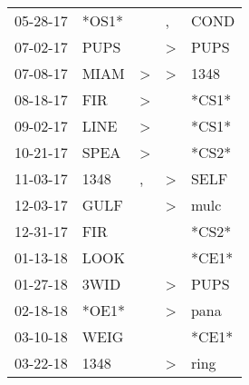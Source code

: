 \begin{supertabular}{p{0.07\textwidth}p{0.06\textwidth}p{0.02\textwidth}p{0.02\textwidth}p{0.06\textwidth}}
          05-28-17\textsuperscript{} &                            *OS1* &                  &                , &           COND\textsuperscript{} \\
          07-02-17\textsuperscript{} &           PUPS\textsuperscript{} &                  &     \textgreater &           PUPS\textsuperscript{} \\
          07-08-17\textsuperscript{} &           MIAM\textsuperscript{} &     \textgreater &     \textgreater &           1348\textsuperscript{} \\
          08-18-17\textsuperscript{} &            FIR\textsuperscript{} &     \textgreater &                  &                            *CS1* \\
          09-02-17\textsuperscript{} &           LINE\textsuperscript{} &     \textgreater &                  &                            *CS1* \\
          10-21-17\textsuperscript{} &           SPEA\textsuperscript{} &     \textgreater &                  &                            *CS2* \\
          11-03-17\textsuperscript{} &           1348\textsuperscript{} &                , &     \textgreater &           SELF\textsuperscript{} \\
          12-03-17\textsuperscript{} &           GULF\textsuperscript{} &                  &     \textgreater &           mulc\textsuperscript{} \\
          12-31-17\textsuperscript{} &            FIR\textsuperscript{} &                  &                  &                            *CS2* \\
          01-13-18\textsuperscript{} &           LOOK\textsuperscript{} &                  &                  &                            *CE1* \\
          01-27-18\textsuperscript{} &           3WID\textsuperscript{} &                  &     \textgreater &           PUPS\textsuperscript{} \\
          02-18-18\textsuperscript{} &                            *OE1* &                  &     \textgreater &           pana\textsuperscript{} \\
          03-10-18\textsuperscript{} &           WEIG\textsuperscript{} &                  &                  &                            *CE1* \\
          03-22-18\textsuperscript{} &           1348\textsuperscript{} &                  &     \textgreater &           ring\textsuperscript{} \\

\end{supertabular}

